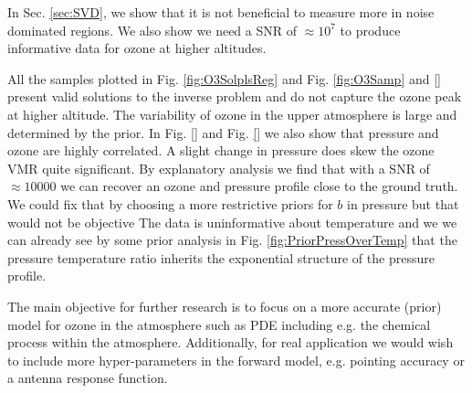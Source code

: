 In Sec. \ref{sec:SVD}, we show that it is not beneficial to measure more in noise dominated regions.
We also show we need a SNR of $\approx10^7$ to produce informative data for ozone at higher altitudes.

All the samples plotted in Fig. \ref{fig:O3SolplsReg} and Fig. \ref{fig:O3Samp} and \ref{} present valid solutions to the inverse problem and do not capture the ozone peak at higher altitude.
The variability of ozone in the upper atmosphere is large and determined by the prior.
In Fig. \ref{} and Fig. \ref{} we also show that pressure and ozone are highly correlated.
A slight change in pressure does skew the ozone VMR quite significant.
By explanatory analysis we find that with a SNR of $\approx 10000$ we can recover an ozone and pressure profile close to the ground truth.
We could fix that by choosing a more restrictive priors for $b$ in pressure but that would not be objective 
The data is uninformative about temperature and we we can already see by some prior analysis in Fig. \ref{fig:PriorPressOverTemp} that the pressure temperature ratio inherits the exponential structure of the pressure profile.

The main objective for further research is to focus on a more accurate (prior) model for ozone in the atmosphere such as PDE including e.g. the chemical process within the atmosphere.
Additionally, for real application we would wish to include more hyper-parameters in the forward model, e.g. pointing accuracy or a antenna response function.




